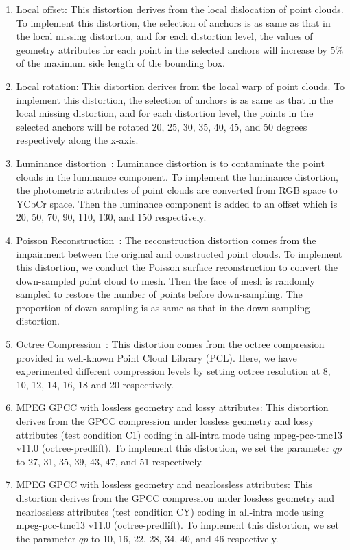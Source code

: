 \documentclass[acmsmall]{acmart}
\begin{document}
\begin{enumerate}
  \item {\sf Local offset}: This distortion derives from the local dislocation of point clouds. To implement this distortion, the selection of anchors is as same as that in the local missing distortion, and for each distortion level, the values of geometry attributes for each point in the selected anchors will increase by 5\% of the maximum side length of the bounding box.
  \item {\sf Local rotation}: This distortion derives from the local warp of point clouds. To implement this distortion, the selection of anchors is as same as that in the local missing distortion, and for each distortion level, the points in the selected anchors will be rotated 20, 25, 30, 35, 40, 45, and 50 degrees respectively along the x-axis.
  \item {\sf Luminance distortion~\cite{Ponomarenko2015TID2013}}: Luminance distortion is to contaminate the point clouds in the luminance component. To implement the luminance distortion, the photometric attributes of point clouds are converted from RGB space to YCbCr space. Then the luminance component is added to an offset which is 20, 50, 70, 90, 110, 130, and 150 respectively.
  \item {\sf Poisson Reconstruction~\cite{Michael2006PoissonRC}}: The reconstruction distortion comes from the impairment between the original and constructed point clouds. To implement this distortion, we conduct the Poisson surface reconstruction to convert the down-sampled point cloud to mesh. Then the face of mesh is randomly sampled to restore the number of points before down-sampling. The proportion of down-sampling is as same as that in the down-sampling distortion.
    \item {\sf Octree Compression~\cite{Yang2020TMM3DTO2D}}: This distortion comes from the octree compression provided in well-known Point Cloud Library (PCL). Here, we have experimented different compression levels by setting octree resolution at 8, 10, 12, 14, 16, 18 and 20 respectively.
  \item {\sf MPEG GPCC with lossless geometry and lossy attributes}: This distortion derives from the GPCC compression under lossless geometry and lossy attributes (test condition C1) coding in all-intra mode using mpeg-pcc-tmc13 v11.0 (octree-predlift). To implement this distortion, we set the parameter $qp$ to 27, 31, 35, 39, 43, 47, and 51 respectively.
  \item {\sf MPEG GPCC with lossless geometry and nearlossless attributes}: This distortion derives from the GPCC compression under lossless geometry and nearlossless attributes (test condition CY) coding in all-intra mode using mpeg-pcc-tmc13 v11.0 (octree-predlift). To implement this distortion, we set the parameter $qp$ to 10, 16, 22, 28, 34, 40, and 46 respectively.

\end{enumerate}
\end{document}
